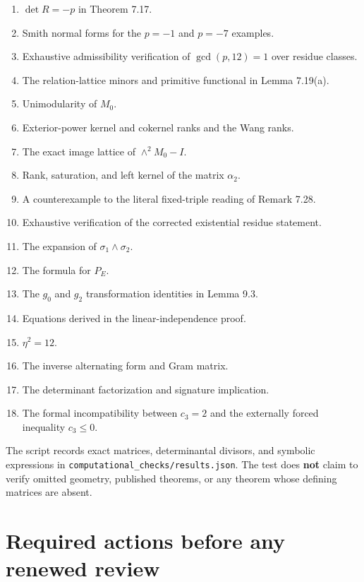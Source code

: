 \documentclass[
  10pt,
]{article}
\providecommand{\tightlist}{%
  \setlength{\itemsep}{0pt}\setlength{\parskip}{0pt}}
\begin{document}
\begin{enumerate}
\def\labelenumi{\arabic{enumi}.}
\tightlist
\item
  \(\det R=-p\) in Theorem 7.17.
\item
  Smith normal forms for the \(p=-1\) and \(p=-7\) examples.
\item
  Exhaustive admissibility verification of \(\gcd(p,12)=1\) over residue
  classes.
\item
  The relation-lattice minors and primitive functional in Lemma 7.19(a).
\item
  Unimodularity of \(M_0\).
\item
  Exterior-power kernel and cokernel ranks and the Wang ranks.
\item
  The exact image lattice of \(\wedge^2M_0-I\).
\item
  Rank, saturation, and left kernel of the matrix \(\alpha_2\).
\item
  A counterexample to the literal fixed-triple reading of Remark 7.28.
\item
  Exhaustive verification of the corrected existential residue
  statement.
\item
  The expansion of \(\sigma_1\wedge\sigma_2\).
\item
  The formula for \(P_E\).
\item
  The \(g_0\) and \(g_2\) transformation identities in Lemma 9.3.
\item
  Equations derived in the linear-independence proof.
\item
  \(\eta^2=12\).
\item
  The inverse alternating form and Gram matrix.
\item
  The determinant factorization and signature implication.
\item
  The formal incompatibility between \(c_3=2\) and the externally forced
  inequality \(c_3\le0\).
\end{enumerate}

The script records exact matrices, determinantal divisors, and symbolic
expressions in \texttt{computational\_checks/results.json}. The test
does \textbf{not} claim to verify omitted geometry, published theorems,
or any theorem whose defining matrices are absent.

\section{Required actions before any renewed
review}\label{required-actions-before-any-renewed-review}
\end{document}

